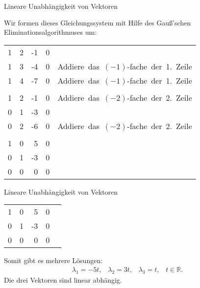 \documentclass[german]{beamer}
\newcommand{\bq}{\begin{eqnarray*}}
\newcommand{\eq}{\end{eqnarray*}}
\begin{document}
\begin{frame}{Lineare Unabh\"angigkeit von Vektoren}

Wir formen dieses Gleichungssystem mit Hilfe des Gau{\ss}'schen Eliminationsalgorithmuses um:
\begin{center}
\begin{tabular}{rrr|rl}
1 & 2 & -1 & 0 & \\
1 & 3 & -4 & 0 & \mbox{Addiere das $(-1)$-fache der 1. Zeile} \\
1 & 4 & -7 & 0 & \mbox{Addiere das $(-1)$-fache der 1. Zeile} \\
 & & & & \\
1 & 2 & -1 & 0 & \mbox{Addiere das $(-2)$-fache der 2. Zeile} \\
0 & 1 & -3 & 0 & \\
0 & 2 & -6 & 0 & \mbox{Addiere das $(-2)$-fache der 2. Zeile} \\
 & & & & \\
1 & 0 &  5 & 0 & \\
0 & 1 & -3 & 0 & \\
0 & 0 &  0 & 0 & \\
\end{tabular}
\end{center}

\end{frame}

\begin{frame}{Lineare Unabh\"angigkeit von Vektoren}

\begin{center}
\begin{tabular}{rrr|rl}
1 & 0 &  5 & 0 & \\
0 & 1 & -3 & 0 & \\
0 & 0 &  0 & 0 & \\
\end{tabular}
\end{center}
Somit gibt es mehrere L\"osungen:
\bq 
 \lambda_1 = -5 t,
 \;\;\;
 \lambda_2 = 3 t,
 \;\;\;
 \lambda_3 = t,
 \;\;\;
 t \in {\mathbb R}.
\eq
Die drei Vektoren sind linear abh\"angig.

\end{frame}


\begin{frame}

\end{frame}
\end{document}
